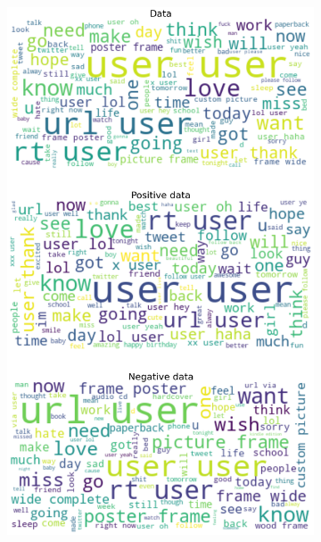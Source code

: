 \documentclass{article}
\begin{document}
\begin{itemize}
\begin{figure}[H]
\centering
\captionsetup{justification=centering}
\begin{subfigure}[b]{0.24\textwidth}
\centering
\includegraphics[width=\textwidth]{chapter-06/section-01-01/11/visualization/1/wordcloud.png}
\end{subfigure}
\begin{subfigure}[b]{0.24\textwidth}
\centering

\end{subfigure}
\end{figure}
\end{itemize}
\end{document}
